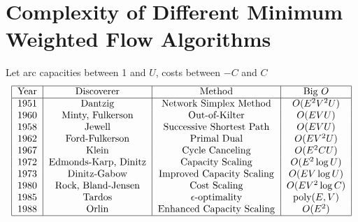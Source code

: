 \documentclass[10pt, twocolumn]{book}
\theoremstyle{definition}
\theoremstyle{plain}
\theoremstyle{remark}
\begin{document}
		\section{Complexity of Different Minimum Weighted Flow Algorithms}
			Let arc capacities between 1 and $U$, costs between $-C$ and $C$
			\begin{align}
				\begin{tabular} {|c|c|c|c|}
					\hline
					Year & Discoverer & Method & Big $O$ \\
					\hline
					1951 & Dantzig & Network Simplex Method & $O(E^2V^2U)$ \\
					1960 & Minty, Fulkerson & Out-of-Kilter & $O(EVU)$\\
					1958 & Jewell & Successive Shortest Path & $O(EVU)$ \\
					1962 & Ford-Fulkerson & Primal Dual & $O(EV^2U)$ \\
					1967 & Klein & Cycle Canceling & $O(E^2CU)$ \\
					1972 & Edmonds-Karp, Dinitz & Capacity Scaling & $O(E^2 \log U)$\\
					1973 & Dinitz-Gabow & Improved Capacity Scaling & $O(EV\log U)$ \\
					1980 & Rock, Bland-Jensen & Cost Scaling & $O(EV^2\log C)$\\
					1985 & Tardos & $\epsilon$-optimality & poly($E,V$)\\
					1988 & Orlin & Enhanced Capacity Scaling & $O(E^2)$ \\
					\hline
				\end{tabular}
			\end{align}
\end{document}
